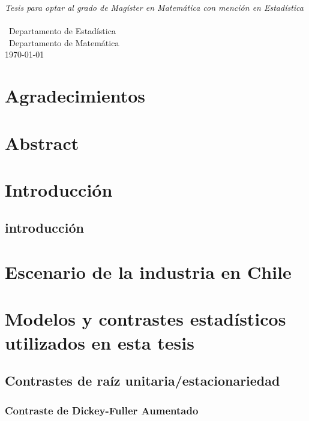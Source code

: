 \documentclass[12pt, twoside]{book}\usepackage[]{graphicx}\usepackage[]{color}
\numberwithin{equation}{section}
\numberwithin{theorem}{section}
\numberwithin{teorema}{section}
\numberwithin{defi}{section}
\numberwithin{prop}{section}
\numberwithin{defi}{section}
\theoremstyle{plain}
\begin{document}
\begin{titlepage}
\begin{center}
\large \textit{Tesis para optar al grado de Magíster en Matemática con mención en Estadística}\\[0.3cm] %
\textit{}\\[0.4cm]
\ Departamento de Estadística \\
[0.4cm]\ Departamento de Matemática
\\[1cm] %
 
{\large \today}\\[2cm] %
 
\end{center}

\end{titlepage}
\newpage



\tableofcontents

\listoffigures
\listoftables
\onehalfspacing
\chapter*{Agradecimientos}
\chapter*{Abstract}
\chapter{Introducción}
\section{introducción}

\chapter{Escenario de la industria en Chile}


\chapter{Modelos y contrastes estadísticos utilizados en esta tesis}


\section{Contrastes de raíz unitaria/estacionariedad}
\subsection{Contraste de Dickey-Fuller Aumentado}
\end{document}
